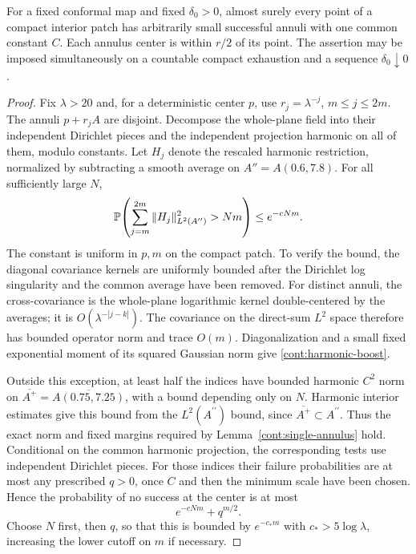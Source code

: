 \begin{lemma}\label{cont:all-point-annuli}
For a fixed conformal map and fixed $\delta_0>0$, almost surely every point
of a compact interior patch has arbitrarily small successful annuli with
one common constant $C$.  Each annulus center is within $r/2$ of its point.
The assertion may be imposed simultaneously on a countable compact
exhaustion and a sequence $\delta_0\downarrow0$.
\end{lemma}

\begin{proof}
Fix $\lambda>20$ and, for a deterministic center $p$, use
$r_j=\lambda^{-j}$, $m\leq j\leq2m$.  The annuli $p+r_jA$ are disjoint.
Decompose the whole-plane field into their independent Dirichlet pieces
and the independent projection harmonic on all of them, modulo constants.
Let $H_j$ denote the rescaled harmonic restriction, normalized by subtracting
a smooth average on $A''=A(0.6,7.8)$.  For all sufficiently large $N$,
\begin{equation}\label{cont:harmonic-boost}
 \mathbb P\!\left(\sum_{j=m}^{2m}\|H_j\|_{L^2(A'')}^2>Nm\right)
       \leq e^{-cNm}.
\end{equation}
The constant is uniform in $p,m$ on the compact patch.  To verify the bound,
the diagonal covariance kernels are uniformly bounded after the Dirichlet
log singularity and the common average have been removed.  For distinct
annuli, the cross-covariance is the whole-plane logarithmic kernel
double-centered by the averages; it is
$O(\lambda^{-|j-k|})$.  The covariance on the direct-sum $L^2$ space
therefore has bounded operator norm and trace $O(m)$.  Diagonalization and
a small fixed exponential moment of its squared Gaussian norm give
\eqref{cont:harmonic-boost}.

Outside this exception, at least half the indices have bounded harmonic
$C^2$ norm on $\overline{A^+}=\overline{A(0.75,7.25)}$, with a bound
depending only on $N$.  Harmonic interior estimates give this bound from
the $L^2(A^{\prime\prime})$ bound, since $\overline{A^+}\subset A^{\prime\prime}$.
Thus the exact norm and fixed margins required by
Lemma~\ref{cont:single-annulus} hold.
Conditional on the common harmonic projection, the corresponding tests
use independent Dirichlet pieces.  For those indices their failure
probabilities are at most any prescribed $q>0$, once $C$ and then the
minimum scale have been chosen.  Hence the probability of no success at
the center is at most
\[
 e^{-cNm}+q^{m/2}.
\]
Choose $N$ first, then $q$, so that this is bounded by $e^{-c_*m}$ with
$c_*>5\log\lambda$, increasing the lower cutoff on $m$ if necessary.


\end{proof}
